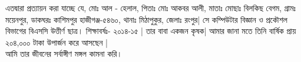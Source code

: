 \documentclass[a4paper]{article}
\begin{document}
\fontsize{17}{20}
\selectfont
\vfill
\noindent
এতদ্বারা প্রত্যায়ন করা যাচ্ছে যে, মোঃ আল - হেলাল, পিতাঃ মোঃ আকবর আলী, মাতাঃ মোছাঃ বিলকিছ বেগম, গ্রামঃ ময়েনপুর, ডাকঘরঃ কাশিমপুর হাজীগঞ্জ-৫৪৬০, থানাঃ মিঠাপুকুর, জেলাঃ রংপুর| সে কম্পিউটার বিজ্ঞান ও প্রকৌশল বিভাগের বিএসসি উত্তীর্ণ ছাত্র। শিক্ষাবর্ষঃ- ২০১৪-১৫ | তার বাবা একজন কৃষক| আমার জানা মতে তিনি বার্ষিক  প্রায় ২০৪,০০০ টাকা উপার্জন করে আসছেন |\\

\vspace{0.7cm}
\noindent
আমি তার জীবনের সর্বাঙ্গীণ মঙ্গল কামনা করি। 
\end{document}
